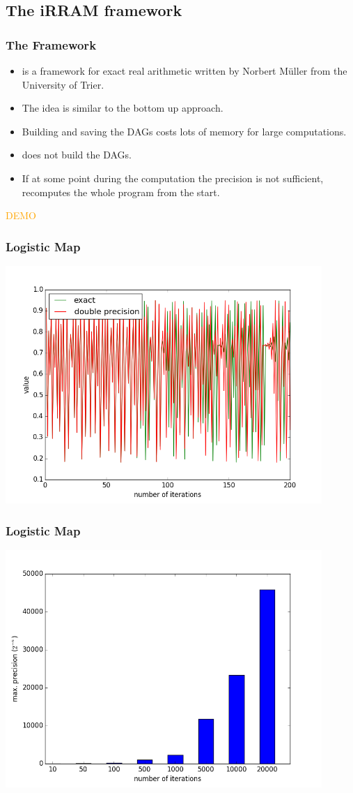 \subsection{The iRRAM framework}
\begin{frame}
  \frametitle{The \irram Framework}
  \begin{itemize}[<+->]
    \item \irram is a \cc framework for exact real arithmetic written by Norbert M\"{u}ller from the University of Trier.
      \item The idea is similar to the bottom up approach.
    \item Building and saving the DAGs costs lots of memory for large computations.
    \item \irram does not build the DAGs.
    \item If at some point during the computation the precision is not sufficient, \irram recomputes the whole program from the start.
  \end{itemize}
\end{frame}
\begin{frame}\centering\huge{\textcolor{orange}{DEMO}}\end{frame}
\begin{frame}
  \centering
  \frametitle{Logistic Map}
    \includegraphics[width=0.9\textwidth]{logistic_map}
\end{frame}
\begin{frame}
  \frametitle{Logistic Map}
  \centering
  \includegraphics[width=0.9\textwidth]{logmap2}
\end{frame}
